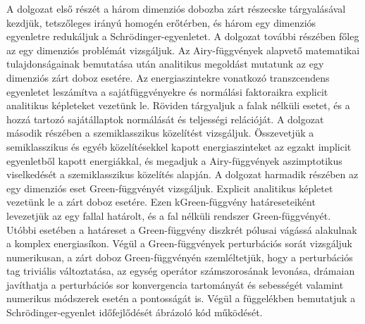 

A dolgozat első részét a három dimenziós dobozba zárt részecske tárgyalásával kezdjük, tetszőleges irányú homogén erőtérben, és három egy dimenziós egyenletre redukáljuk a Schrödinger-egyenletet. A dolgozat további részében főleg az egy dimenziós problémát vizsgáljuk. Az Airy-függvények alapvető matematikai tulajdonságainak bemutatása után analitikus megoldást mutatunk az egy dimenziós zárt doboz esetére. Az energiaszintekre vonatkozó transzcendens egyenletet leszámítva a sajátfüggvényekre és normálási faktoraikra explicit analitikus képleteket vezetünk le. Röviden tárgyaljuk a falak nélküli esetet, és a hozzá tartozó sajátállaptok normálását és teljességi relációját.
A dolgozat második részében a szemiklasszikus közelítést vizsgáljuk. Összevetjük a semiklasszikus és egyéb közelítésekkel kapott energiaszinteket az egzakt implicit egyenletből kapott energiákkal, és megadjuk a Airy-függvények aszimptotikus viselkedését a szemiklasszikus közelítés alapján.
A dolgozat harmadik részében az egy dimenziós eset Green-függvényét vizsgáljuk. Explicit analitikus képletet vezetünk le a zárt doboz esetére. Ezen kGreen-függvény határeseteiként levezetjük az egy fallal határolt, és a fal nélküli rendszer Green-függvényét. Utóbbi esetében a határeset a Green-függvény diszkrét pólusai vágássá alakulnak a komplex energiasíkon. Végül a Green-függvények perturbációs sorát vizsgáljuk numerikusan, a zárt doboz Green-függvényén szemléltetjük, hogy a perturbációs tag triviális változtatása, az egység operátor számszorosának levonása, drámaian javíthatja a perturbációs sor konvergencia tartományát és sebességét valamint numerikus módszerek esetén a pontosságát is. Végül a függelékben bemutatjuk a Schrödinger-egyenlet időfejlődését ábrázoló kód működését.








